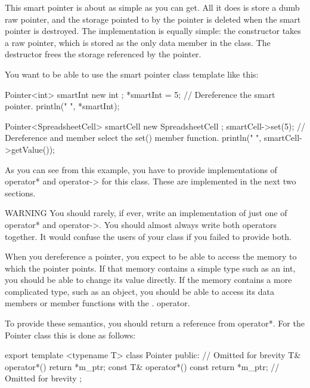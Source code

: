 This smart pointer is about as simple as you can get. All it does is store a dumb raw pointer, and the storage pointed to by the pointer is deleted when the smart pointer is destroyed. The implementation is equally simple: the constructor takes a raw pointer, which is stored as the only data member in the class. The destructor frees the storage referenced by the pointer.

You want to be able to use the smart pointer class template like this:

\begin{cpp}
Pointer<int> smartInt { new int };
*smartInt = 5; // Dereference the smart pointer.
println("{} ", *smartInt);

Pointer<SpreadsheetCell> smartCell { new SpreadsheetCell };
smartCell->set(5); // Dereference and member select the set() member function.
println("{} ", smartCell->getValue());
\end{cpp}

As you can see from this example, you have to provide implementations of operator* and operator-> for this class. These are implemented in the next two sections.

\begin{myWarning}{WARNING}
You should rarely, if ever, write an implementation of just one of operator* and operator->. You should almost always write both operators together. It would confuse the users of your class if you failed to provide both.
\end{myWarning}


When you dereference a pointer, you expect to be able to access the memory to which the pointer points. If that memory contains a simple type such as an int, you should be able to change its value directly. If the memory contains a more complicated type, such as an object, you should be able to access its data members or member functions with the . operator.

To provide these semantics, you should return a reference from operator*. For the Pointer class this is done as follows:

\begin{cpp}
export template <typename T> class Pointer
{
    public:
        // Omitted for brevity
        T& operator*() { return *m_ptr; }
        const T& operator*() const { return *m_ptr; }
        // Omitted for brevity
};
\end{cpp}

